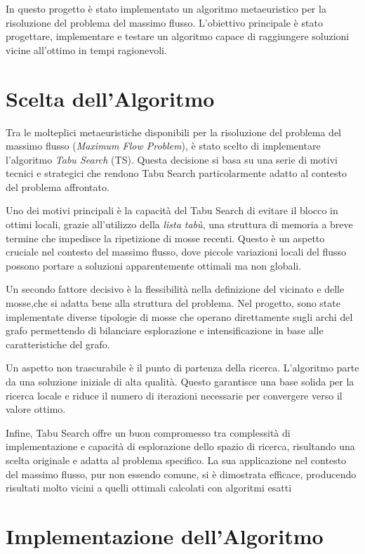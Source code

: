 \documentclass[12pt,a4paper]{article}
\begin{document}
In questo progetto è stato implementato un algoritmo metaeuristico per la risoluzione del problema del massimo flusso. L’obiettivo principale è stato progettare, implementare e testare un algoritmo capace di raggiungere soluzioni vicine all’ottimo in tempi ragionevoli.

\section{Scelta dell'Algoritmo}

Tra le molteplici metaeuristiche disponibili per la risoluzione del problema del massimo flusso (\textit{Maximum Flow Problem}), è stato scelto di implementare l'algoritmo \textit{Tabu Search} (TS). Questa decisione si basa su una serie di motivi tecnici e strategici che rendono Tabu Search particolarmente adatto al contesto del problema affrontato.

Uno dei motivi principali è la capacità del Tabu Search di evitare il blocco in ottimi locali, grazie all’utilizzo della \textit{lista tabù}, una struttura di memoria a breve termine che impedisce la ripetizione di mosse recenti. Questo è un aspetto cruciale nel contesto del massimo flusso, dove piccole variazioni locali del flusso possono portare a soluzioni apparentemente ottimali ma non globali.

Un secondo fattore decisivo è la flessibilità nella definizione del vicinato e delle mosse,che si adatta bene alla struttura del problema. Nel progetto, sono state implementate diverse tipologie di mosse che operano direttamente sugli archi del grafo permettendo di bilanciare esplorazione e intensificazione in base alle caratteristiche del grafo.

Un aspetto non trascurabile è il punto di partenza della ricerca. L’algoritmo parte da una soluzione iniziale di alta qualità. Questo garantisce una base solida per la ricerca locale e riduce il numero di iterazioni necessarie per convergere verso il valore ottimo.

Infine, Tabu Search offre un buon compromesso tra complessità di implementazione e capacità di esplorazione dello spazio di ricerca, risultando una scelta originale e adatta al problema specifico. La sua applicazione nel contesto del massimo flusso, pur non essendo comune, si è dimostrata efficace, producendo risultati molto vicini a quelli ottimali calcolati con algoritmi esatti

\section{Implementazione dell'Algoritmo}
\end{document}
